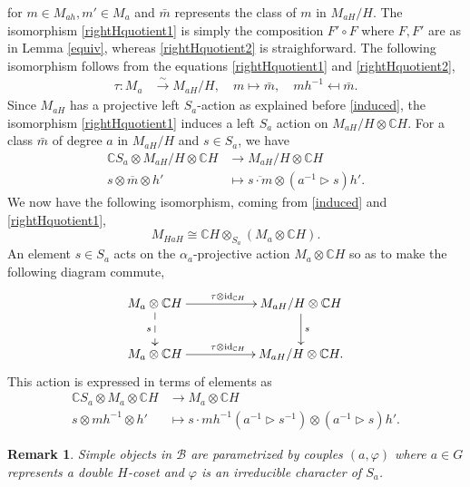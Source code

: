 \documentclass[a4paper, 10pt]{book}
\newtheorem{Rem}[theorem]{Remark}
\theoremstyle{definition}
\numberwithin{equation}{chapter}
\newcommand\hit{\triangleright}
\newcommand\inv{^{-1}}
\newcommand\id{\operatorname{id}}
\newcommand\ot{\otimes}
\newcommand\Vect{\operatorname{Vec}}
\newcommand\CC{\mathbb C}
\newcommand\B{\mathcal B}
\begin{document}
for $m \in M_{ah}, m'\in M_a$ and $\bar{m}$ represents the class of $m$ in $M_{aH}/H$. The isomorphism \eqref{rightHquotient1} is simply the composition $F'\circ F$ where $F, F'$ are as in Lemma \ref{equiv}, whereas \eqref{rightHquotient2} is straighforward. The following isomorphism follows from the equations \eqref{rightHquotient1} and \eqref{rightHquotient2},\begin{align}\label{Miso}
	\tau: M_a &\overset{\sim} \longrightarrow M_{aH}/H, \quad m\mapsto \bar{m}, \quad mh\inv \mapsfrom \bar{m}.
\end{align} 
Since $M_{aH}$ has a projective left $S_a$-action as explained before \eqref{induced}, the isomorphism \eqref{rightHquotient1} induces a left $S_a$ action on $M_{aH}/H\ot \CC H$. For a class $\bar{m}$ of degree $a$ in $M_{aH}/H$ and $s\in S_a$, we have \begin{align}\label{action}
 \CC S_a \otimes M_{aH}/H\otimes \CC H &\rightarrow M_{aH}/H\otimes \CC H \\
	s\otimes \overline{m} \otimes h'&\mapsto \overline{s\cdot m} \otimes (a\inv \hit s)h'.
\end{align}We now have the following isomorphism, coming from \eqref{induced} and \eqref{rightHquotient1},  \begin{equation}\label{simpleiso}
	 M_{HaH} \cong  \mathbb{C}H  \otimes_{S_a} (M_a \otimes \CC H).
\end{equation}
An element $s\in S_a$ acts on the $\alpha_a$-projective action $M_{a}\ot \CC H$ so as to make the following diagram commute,
 \begin{equation}\label{repdiagram}
\xymatrix{ M_{a}\otimes \CC H  \ar[rr]^{\tau\otimes \id_{\CC H}} \ar@{-->}[d]_s & & M_{aH}/H\otimes \CC H \ar[d]^s \\
M_a \otimes \CC H\ar[rr]^{\tau\otimes \id_{\CC H}} && M_{aH}/H\otimes \CC H.
}
\end{equation} This action is expressed in terms of elements as
\begin{align}\label{action2}
	\CC S_a \otimes M_a\otimes \CC H &\rightarrow M_a\otimes \CC H \\
	s\otimes  mh\inv \otimes h'&\mapsto   s\cdot mh\inv (a\inv \hit s\inv)  \otimes (a\inv \hit s)  h'.\nonumber	
\end{align} 
\begin{Rem}\label{isoparam}
Simple objects in $\B$ are parametrized by couples $(a, \varphi)$ where $a\in G$ represents a double $H$-coset and $\varphi$ is an irreducible character of $S_a$.
\end{Rem}

\end{document}
